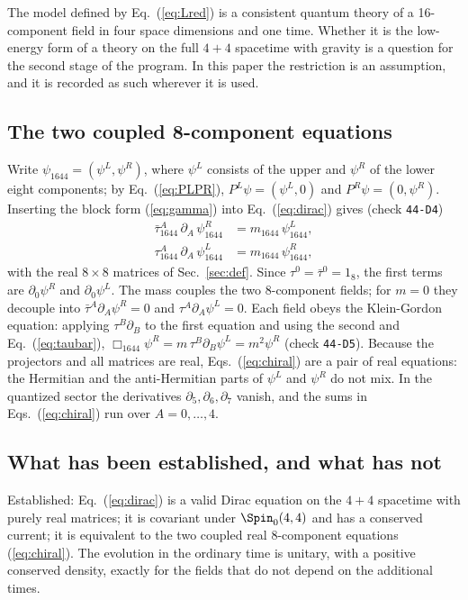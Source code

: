 The model defined by Eq.~(\ref{eq:Lred}) is a consistent quantum theory of a 16-component field in
four space dimensions and one time. Whether it is the low-energy form of a theory on the full $4+4$
spacetime with gravity is a question for the second stage of the program. In this paper the
restriction is an assumption, and it is recorded as such wherever it is used.

\subsection{The two coupled 8-component equations}

Write $\psi_{1644}=(\psi^{L},\psi^{R})$, where $\psi^{L}$ consists of the upper and $\psi^{R}$ of the
lower eight components; by Eq.~(\ref{eq:PLPR}), $P^{L}\psi=(\psi^{L},0)$ and $P^{R}\psi=(0,\psi^{R})$.
Inserting the block form (\ref{eq:gamma}) into Eq.~(\ref{eq:dirac}) gives (check \texttt{44-D4})
\begin{align}
\bar\tau_{1644}^A\,\partial_A\,\psi_{1644}^{R}&=m_{1644}\,\psi_{1644}^{L},\nonumber\\
\tau_{1644}^A\,\partial_A\,\psi_{1644}^{L}&=m_{1644}\,\psi_{1644}^{R},
\label{eq:chiral}
\end{align}
with the real $8\times8$ matrices of Sec.~\ref{sec:def}. Since $\tau^0=\bar\tau^0=1_8$, the first
terms are $\partial_0\psi^{R}$ and $\partial_0\psi^{L}$. The mass couples the two 8-component fields;
for $m=0$ they decouple into $\bar\tau^A\partial_A\psi^{R}=0$ and $\tau^A\partial_A\psi^{L}=0$. Each
field obeys the Klein-Gordon equation: applying $\tau^B\partial_B$ to the first equation and using the
second and Eq.~(\ref{eq:taubar}), $\Box_{1644}\psi^{R}=m\,\tau^B\partial_B\psi^{L}=m^2\psi^{R}$ (check
\texttt{44-D5}). Because the projectors and all matrices are real, Eqs.~(\ref{eq:chiral}) are a pair of
real equations: the Hermitian and the anti-Hermitian parts of $\psi^{L}$ and $\psi^{R}$ do not mix.
In the quantized sector the derivatives $\partial_5,\partial_6,\partial_7$ vanish, and the sums in
Eqs.~(\ref{eq:chiral}) run over $A=0,\dots,4$.

\subsection{What has been established, and what has not}

Established: Eq.~(\ref{eq:dirac}) is a valid Dirac equation on the $4+4$ spacetime with purely real
matrices; it is covariant under $\Spin_0(4,4)$ and has a conserved current; it is equivalent to the
two coupled real 8-component equations (\ref{eq:chiral}). The evolution in the ordinary time is
unitary, with a positive conserved density, exactly for the fields that do not depend on the
additional times.

